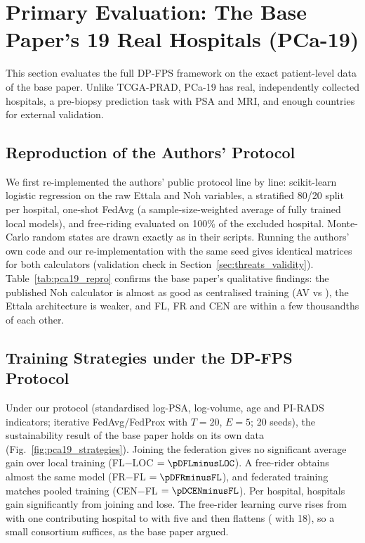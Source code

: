 \section{Primary Evaluation: The Base Paper's 19 Real Hospitals (PCa-19)}
\label{sec:pca19}
This section evaluates the full DP-FPS framework on the exact patient-level data of the base paper. Unlike TCGA-PRAD, PCa-19 has real, independently collected hospitals, a pre-biopsy prediction task with PSA and MRI, and enough countries for external validation.

\subsection{Reproduction of the Authors' Protocol}
\label{sec:p19_repro}
We first re-implemented the authors' public protocol line by line: scikit-learn logistic regression on the raw Ettala and Noh variables, a stratified 80/20 split per hospital, one-shot FedAvg (a sample-size-weighted average of fully trained local models), and free-riding evaluated on 100\% of the excluded hospital. Monte-Carlo random states are drawn exactly as in their scripts. Running the authors' own code and our re-implementation with the same seed gives identical matrices for both calculators (validation check in Section~\ref{sec:threats_validity}). Table~\ref{tab:pca19_repro} confirms the base paper's qualitative findings: the published Noh calculator is almost as good as centralised training (AV \pRepNohBL{} vs \pRepNohCEN{}), the Ettala architecture is weaker, and FL, FR and CEN are within a few thousandths of each other.



\subsection{Training Strategies under the DP-FPS Protocol}
Under our protocol (standardised log-PSA, log-volume, age and PI-RADS indicators; iterative FedAvg/FedProx with $T=20$, $E=5$; 20 seeds), the sustainability result of the base paper holds on its own data (Fig.~\ref{fig:pca19_strategies}). Joining the federation gives no significant average gain over local training (FL$-$LOC $=\pDFLminusLOC$). A free-rider obtains almost the same model (FR$-$FL $=\pDFRminusFL$), and federated training matches pooled training (CEN$-$FL $=\pDCENminusFL$). Per hospital, \pGainSig{} hospitals gain significantly from joining and \pLossSig{} lose. The free-rider learning curve rises from \pLcFrOne{} with one contributing hospital to \pLcFrFive{} with five and then flattens (\pLcFrLast{} with 18), so a small consortium suffices, as the base paper argued.

